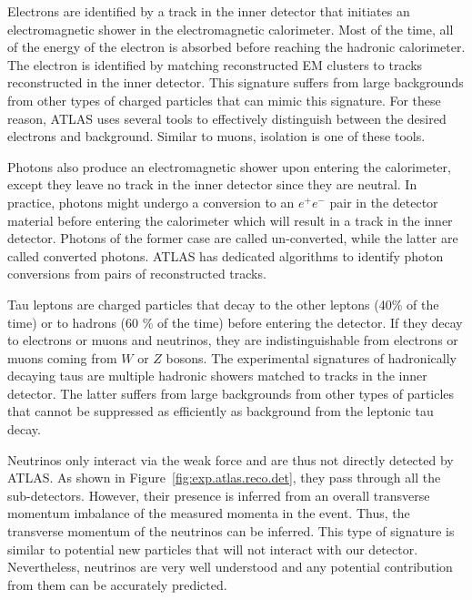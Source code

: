 Electrons are identified by a track in the inner detector that 
initiates  an electromagnetic
shower in the electromagnetic calorimeter. Most of the time,  
all of the energy of the electron is absorbed before reaching the hadronic 
calorimeter.
The electron is identified  by matching reconstructed EM clusters to tracks
reconstructed in the inner detector. 
This signature suffers from 
large backgrounds from other types of charged particles that can mimic this 
signature. For these reason, ATLAS uses several tools to effectively 
distinguish between the desired electrons and background.
Similar to muons, isolation is one of these tools.

Photons also produce an electromagnetic shower upon entering the calorimeter, 
except they leave no track in the inner detector since they are neutral.
In practice, photons might undergo a conversion to an $e^+e^-$ pair 
in the detector material before entering the calorimeter which will 
result in a track in the inner detector. Photons of the former case 
are called un-converted, while the latter are called converted photons.
ATLAS has dedicated algorithms to identify photon conversions from 
pairs of reconstructed tracks.%

Tau leptons are charged particles that decay to the other leptons 
(40\% of the time) or to hadrons (60 \% of the time) before entering the detector.
If they decay to electrons or muons and neutrinos, they are indistinguishable from 
electrons or muons coming from $W$ or $Z$ bosons.
The experimental signatures of hadronically decaying taus are
multiple hadronic showers matched to tracks in the inner detector.
The latter suffers from large backgrounds 
from other types of particles that cannot be suppressed 
as efficiently as background from the leptonic tau decay.


Neutrinos only interact via the weak force
and are thus not directly detected by ATLAS.
As shown in Figure~\ref{fig:exp.atlas.reco.det}, 
they pass through all the sub-detectors.
However, their presence is inferred from an overall 
transverse momentum imbalance of the measured momenta in the event.
Thus, the transverse momentum of the neutrinos can be inferred.
This type of signature is similar to potential new particles 
that will not interact with our detector.
Nevertheless, neutrinos are very well understood
and any potential contribution from them can be accurately 
predicted.

